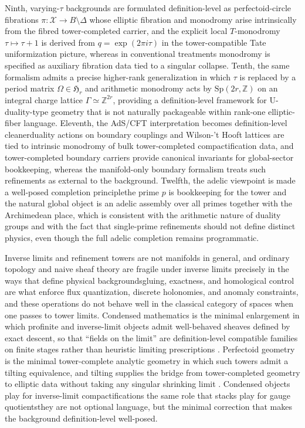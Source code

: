 \documentclass[11pt]{article}
\theoremstyle{remark}
\newcommand{\Z}{\mathbb{Z}}
\begin{document}
Ninth, varying-\(\tau\) backgrounds are formulated definition-level as perfectoid-circle fibrations \(\pi:\mathcal{X}\to B\setminus\Delta\) whose elliptic fibration and monodromy arise intrinsically from the fibred tower-completed carrier, and the explicit local \(T\)-monodromy \(\tau\mapsto\tau+1\) is derived from \(q=\exp(2\pi i\tau)\) in the tower-compatible Tate uniformization picture, whereas in conventional treatments monodromy is specified as auxiliary fibration data tied to a singular collapse. Tenth, the same formalism admits a precise higher-rank generalization in which \(\tau\) is replaced by a period matrix \(\Omega\in\mathfrak{H}_{r}\) and arithmetic monodromy acts by \(\mathrm{Sp}(2r,\Z)\) on an integral charge lattice \(\Gamma\simeq \Z^{2r}\), providing a definition-level framework for U-duality-type geometry that is not naturally packageable within rank-one elliptic-fiber language. Eleventh, the AdS/CFT interpretation becomes definition-level cleaner\:duality actions on boundary couplings and Wilson-'t Hooft lattices are tied to intrinsic monodromy of bulk tower-completed compactification data, and tower-completed boundary carriers provide canonical invariants for global-sector bookkeeping, whereas the manifold-only boundary formalism treats such refinements as external to the background. Twelfth, the adelic viewpoint is made a well-posed completion principle\:the prime \(p\) is bookkeeping for the tower and the natural global object is an adelic assembly over all primes together with the Archimedean place, which is consistent with the arithmetic nature of duality groups and with the fact that single-prime refinements should not define distinct physics, even though the full adelic completion remains programmatic.

Inverse limits and refinement towers are not manifolds in general, and ordinary topology and naive sheaf theory are fragile under inverse limits precisely in the ways that define physical backgrounds\:gluing, exactness, and homological control are what enforce flux quantization, discrete holonomies, and anomaly constraints, and these operations do not behave well in the classical category of spaces when one passes to tower limits. Condensed mathematics is the minimal enlargement in which profinite and inverse-limit objects admit well-behaved sheaves defined by exact descent, so that ``fields on the limit'' are definition-level compatible families on finite stages rather than heuristic limiting prescriptions \cite{ClausenScholze}. Perfectoid geometry is the minimal tower-complete analytic geometry in which such towers admit a tilting equivalence, and tilting supplies the bridge from tower-completed geometry to elliptic data without taking any singular shrinking limit \cite{Scholze2012, ScholzeWeinstein2017}. Condensed objects play for inverse-limit compactifications the same role that stacks play for gauge quotients\:they are not optional language, but the minimal correction that makes the background definition-level well-posed.
\end{document}
